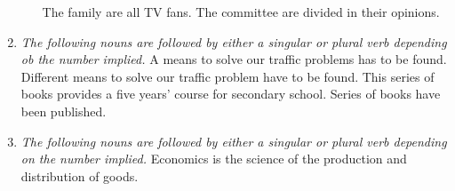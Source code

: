\begin{enumerate}
\begin{enumerate}
                \newline
                \newline
                The family are all TV fans.
                \newline
                \newline
                The committee are divided in their opinions.
        \end{enumerate}
    \item
        {\it
        The following nouns are followed by either a singular or plural verb
        depending ob the number implied.
        }
        \newline
        \newline
        {\centering
        }
        \newline
        \newline
        A means to solve our traffic problems has to be found.
        \newline
        \newline
        Different means to solve our traffic problem have to be found.
        \newline
        \newline
        This series of books provides a five years' course for secondary school.
        \newline
        \newline
        Series of books have been published.
    \item
        {\it
        The following nouns are followed by either a singular or plural verb
        depending on the number implied.
        }
        \newline
        \newline
        {\centering
        }
        \newline
        \newline
        Economics is the science of the production and distribution of goods.

\end{enumerate}

